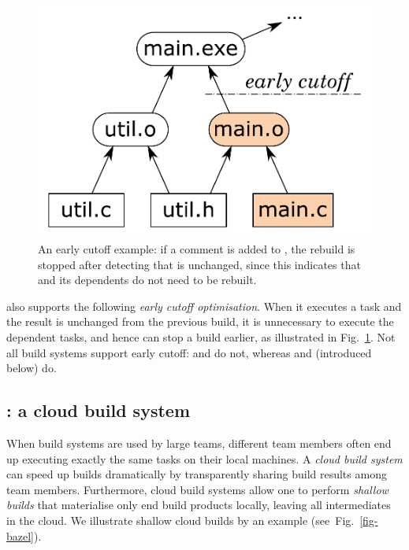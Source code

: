 \begin{figure}[h]
\vspace{-5mm}
\centerline{\includegraphics[scale=0.28]{fig/shake-example-cutoff.pdf}}
\vspace{-3mm}
\caption{An early cutoff example: if a comment is added to , the
rebuild is stopped after detecting that  is unchanged, since this
indicates that  and its dependents do not need to be
rebuilt.\label{fig-cutoff}}
\vspace{-2mm}
\end{figure}

\Shake also supports the following \emph{early cutoff optimisation}. When it
executes a task and the result is unchanged from the previous build, it is
unnecessary to execute the dependent tasks, and hence \Shake can stop a build
earlier, as illustrated in Fig.~\ref{fig-cutoff}. Not all build systems support
early cutoff: \Make and \Excel do not, whereas \Shake and \Bazel (introduced
below) do.

\subsection{\Bazel: a cloud build system}
\label{sec-background-bazel}

When build systems are used by large teams, different team members often end up
executing exactly the same tasks on their local machines. A \emph{cloud build
system} can speed up builds dramatically by transparently sharing build results
among team members. Furthermore, cloud build systems allow one to perform
\emph{shallow builds} that materialise only end build products locally, leaving
all intermediates in the cloud. We illustrate shallow cloud builds by an example
(see~Fig.~\ref{fig-bazel}).

